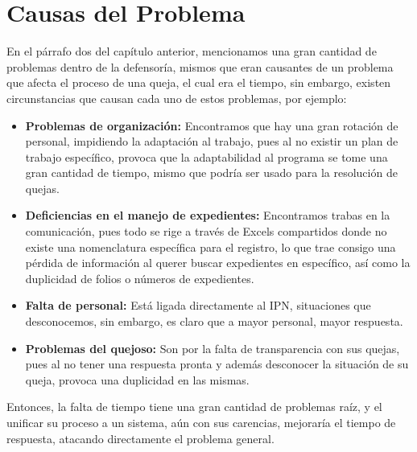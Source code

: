 \section{Causas del Problema}
En el párrafo dos del capítulo anterior, mencionamos una gran cantidad de problemas dentro de la defensoría, mismos que eran causantes de un problema que afecta el proceso de una queja, el cual era el tiempo, sin embargo, existen circunstancias que causan cada uno de estos problemas, por ejemplo:

\begin{itemize}
    \item \textbf{Problemas de organización:} Encontramos que hay una gran rotación de personal, impidiendo la adaptación al trabajo, pues al no existir un plan de trabajo específico, provoca que la adaptabilidad al programa se tome una gran cantidad de tiempo, mismo que podría ser usado para la resolución de quejas.
    
    \item \textbf{Deficiencias en el manejo de expedientes:} Encontramos trabas en la comunicación, pues todo se rige a través de Excels compartidos donde no existe una nomenclatura específica para el registro, lo que trae consigo una pérdida de información al querer buscar expedientes en específico, así como la duplicidad de folios o números de expedientes.
    
    \item \textbf{Falta de personal:} Está ligada directamente al IPN, situaciones que desconocemos, sin embargo, es claro que a mayor personal, mayor respuesta.
    
    \item \textbf{Problemas del quejoso:} Son por la falta de transparencia con sus quejas, pues al no tener una respuesta pronta y además desconocer la situación de su queja, provoca una duplicidad en las mismas.
\end{itemize}

Entonces, la falta de tiempo tiene una gran cantidad de problemas raíz, y el unificar su proceso a un sistema, aún con sus carencias, mejoraría el tiempo de respuesta, atacando directamente el problema general.
